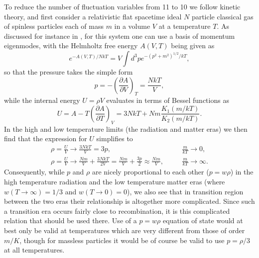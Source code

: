 To reduce the number of fluctuation variables from 11 to 10 we follow kinetic theory, and first consider a relativistic flat spacetime ideal $N$ particle classical gas of spinless particles each of mass $m$ in a volume $V$ at a temperature $T$. As discussed for instance in \cite{mannheim_2006}, for this
system one can use a basis of momentum eigenmodes, with the Helmholtz free energy $A(V,T)$ being given as 
%                                                                               
\begin{equation}
e^{-A(V,T)/NkT}=V\int
d^3pe^{-(p^2+m^2)^{1/2}/kT}, 
\label{9.50}
\end{equation}                                 
%  
so that the pressure takes the simple form 
%                                                                               
\begin{equation}
p=-\left(\frac{\partial A}{ \partial
	V}\right)_T=\frac{NkT}{V},
\label{9.51}
\end{equation}                                 
% 
while the internal energy $U=\rho V$ evaluates in terms of Bessel
functions as  
%                                                                               
\begin{equation}
U=A-T\left(\frac{\partial A}{ \partial
	T}\right)_V=3NkT+Nm\frac{K_1(m/kT)}{K_2(m/kT)}.
\label{9.52}
\end{equation}                                 
% 
In the high and low temperature limits (the radiation and matter eras)
we then find that the expression for $U$ simplifies to
%                                                                               
\begin{eqnarray}
\rho=\frac{U}{V}\rightarrow
\frac{3NkT}{V}=3p,&&\quad \frac{m}{kT}\rightarrow 0,
\nonumber \\
\rho=\frac{U}{V} \rightarrow
\frac{Nm}{V}+\frac{3NkT}{2V}=\frac{Nm}{V}+\frac{3p}{2} \approx
\frac{Nm}{V},&&\quad \frac{m}{kT}
\rightarrow \infty.
\label{9.53}
\end{eqnarray}                                 
% 
Consequently, while $p$ and $\rho$ are nicely proportional to each other ($p=w\rho$)
in the high temperature radiation and the low temperature matter eras
(where $w(T\rightarrow\infty)=1/3$ and $w(T\rightarrow 0)=0$), we also
see that in transition region between the two eras their relationship is
altogether more complicated. Since such a transition era occurs fairly close to recombination, it is this complicated relation that should be used there. Use of a $p=w\rho$ equation of state would at best only be valid at temperatures which are very different from
those of order $m/K$, though for massless particles it would be of
course be valid to use $p=\rho/3$ at all temperatures. 

